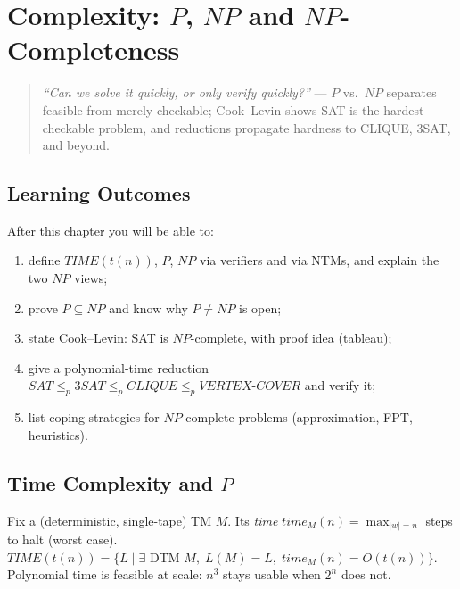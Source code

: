 \chapter{Complexity: $P$, $NP$ and $NP$-Completeness}
\label{ch:complexity}

\begin{quote}
\emph{``Can we solve it quickly, or only verify quickly?''} --- $P$ vs.\ $NP$ separates feasible from merely checkable; Cook--Levin shows SAT is the hardest checkable problem, and reductions propagate hardness to CLIQUE, 3SAT, and beyond.
\end{quote}

\noindent{}
\vspace{0.4em}

\section*{Learning Outcomes}
After this chapter you will be able to:
\begin{enumerate}[label=(L\arabic*)]
    \item define $TIME(t(n))$, $P$, $NP$ via verifiers and via NTMs, and explain the two $NP$ views;
    \item prove $P\subseteq NP$ and know why $P\neq NP$ is open;
    \item state Cook--Levin: SAT is $NP$-complete, with proof idea (tableau);
    \item give a polynomial-time reduction $SAT\le_p 3SAT\le_p CLIQUE\le_p VERTEX\text{-}COVER$ and verify it;
    \item list coping strategies for $NP$-complete problems (approximation, FPT, heuristics).
\end{enumerate}

\section{Time Complexity and $P$}
\label{sec:P}
Fix a (deterministic, single-tape) TM $M$. Its \emph{time} $time_M(n)=\max_{|w|=n}$ steps to halt (worst case). $TIME(t(n))=\{L\mid\exists\text{ DTM }M,\;L(M)=L,\;time_M(n)=O(t(n))\}$. Polynomial time is feasible at scale: $n^3$ stays usable when $2^n$ does not.

